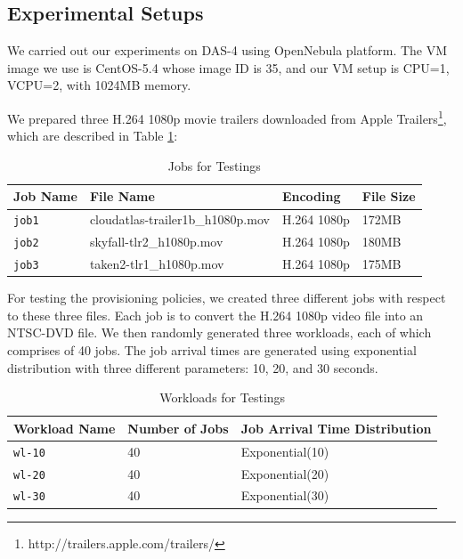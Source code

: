 \subsection{Experimental Setups}
We carried out our experiments on DAS-4 using OpenNebula platform. The
VM image we use is CentOS-5.4 whose image ID is 35, and our VM setup
is CPU=1, VCPU=2, with 1024MB memory.

We prepared three H.264 1080p movie trailers downloaded from Apple
Trailers\footnote{http://trailers.apple.com/trailers/}, which are
described in Table \ref{table_joblist}:

\begin{table}[!t]
  \caption{Jobs for Testings}
  \label{table_joblist}
  \centering
  \begin{tabular}{|l|l|l|l|}
    \hline
    Job Name & File Name & Encoding & File Size\\
    \hline
    \texttt{job1} & cloudatlas-trailer1b\_h1080p.mov & H.264 1080p & 172MB \\
    \hline
    \texttt{job2} & skyfall-tlr2\_h1080p.mov & H.264 1080p & 180MB \\
    \hline
    \texttt{job3} & taken2-tlr1\_h1080p.mov & H.264 1080p & 175MB \\
    \hline
  \end{tabular}
\end{table}

For testing the provisioning policies, we created three different jobs
with respect to these three files. Each job is to convert the H.264
1080p video file into an NTSC-DVD file. We then randomly generated
three workloads, each of which comprises of 40 jobs. The job arrival
times are generated using exponential distribution with three
different parameters: 10, 20, and 30 seconds.

\begin{table}[!t]
  \caption{Workloads for Testings}
  \label{table_workloadlist}
  \centering
  \begin{tabular}{|l|l|l|}
    \hline
    Workload Name & Number of Jobs & Job Arrival Time Distribution \\
    \hline
    \texttt{wl-10} & 40 & Exponential(10) \\
    \hline
    \texttt{wl-20} & 40 & Exponential(20) \\
    \hline
    \texttt{wl-30} & 40 & Exponential(30) \\
    \hline
  \end{tabular}
\end{table}


